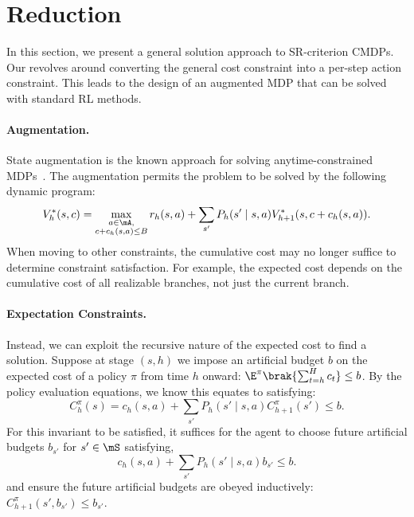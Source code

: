 \documentclass[pdftex, a4paper, 12pt]{article}
\begin{document}
\section{Reduction}\label{sec: reduction}

In this section, we present a general solution approach to SR-criterion CMDPs. Our revolves around converting the general cost constraint into a per-step action constraint. This leads to the design of an augmented MDP that can be solved with standard RL methods. 

\paragraph{Augmentation.} State augmentation is the known approach for solving anytime-constrained MDPs~\cite{acRL}. The augmentation permits the problem to be solved by the following dynamic program:
\begin{equation}
    V^*_h(s,c) = \max_{\substack{a \in \mA, \\ c + c_h(s,a)\leq B}} r_h(s,a) + \sum_{s'} P_h(s' \mid s,a)V^*_{h+1}(s, c+c_h(s,a)).
\end{equation}
When moving to other constraints, the cumulative cost may no longer suffice to determine constraint satisfaction. For example, the expected cost depends on the cumulative cost of all realizable branches, not just the current branch.

\paragraph{Expectation Constraints.} Instead, we can exploit the recursive nature of the expected cost to find a solution. Suppose at stage $(s,h)$ we impose an artificial budget $b$ on the expected cost of a policy $\pi$ from time $h$ onward: $\E^{\pi}\brak{\sum_{t = h}^H c_t} \leq b$. By the policy evaluation equations, we know this equates to satisfying:
\begin{equation}
    C_h^{\pi}(s) = c_h(s,a) + \sum_{s'} P_h(s' \mid s,a) C_{h+1}^{\pi}(s') \leq b.
\end{equation}
For this invariant to be satisfied, it suffices for the agent to choose future artificial budgets $b_{s'}$ for $s' \in \mS$ satisfying,
\begin{equation}\label{equ: budgets}
    c_h(s,a) + \sum_{s'} P_h(s' \mid s,a) b_{s'} \leq b.
\end{equation}
and ensure the future artificial budgets are obeyed inductively: $C_{h+1}^{\pi}(s', b_{s'}) \leq b_{s'}$.
\end{document}
